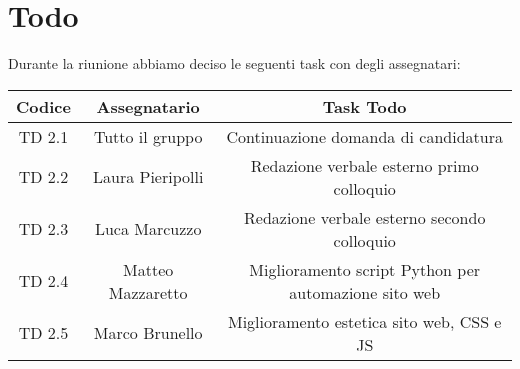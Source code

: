 \section{Todo}

Durante la riunione abbiamo deciso le seguenti task con degli assegnatari:

\vspace{0.5cm}

\begin{table}[htbp]
	\begin{tabular}{|c|c|c|}
		\hline
		\rowcolor[gray]{0.9}
		Codice & Assegnatario & Task Todo \\
		\hline
		TD 2.1 & Tutto il gruppo & Continuazione domanda di candidatura \\
		\hline
		TD 2.2 & Laura Pieripolli & Redazione verbale esterno primo colloquio \\
		\hline
		TD 2.3 & Luca Marcuzzo & Redazione verbale esterno secondo colloquio \\
		\hline
		TD 2.4 & Matteo Mazzaretto & Miglioramento script Python per automazione sito web \\
		\hline
		TD 2.5 & Marco Brunello & Miglioramento estetica sito web, CSS e JS \\
		\hline
	\end{tabular}
\end{table}